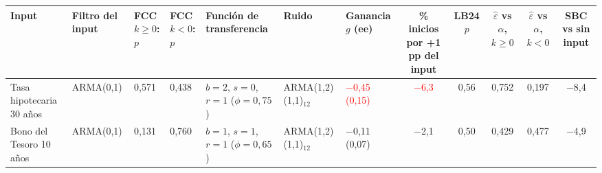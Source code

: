 \begin{tabular}{lllllllccccc}
\toprule
Input & Filtro del input & FCC $k\geq0$: $p$ & FCC $k<0$: $p$ & Funci\'on de transferencia & Ruido & Ganancia $g$ (ee) & \% inicios por +1 pp del input & LB24 $p$ & $\hat\varepsilon$ vs $\alpha$, $k\geq0$ & $\hat\varepsilon$ vs $\alpha$, $k<0$ & SBC vs sin input
\\ \midrule
Tasa hipotecaria 30 a\~nos & ARMA(0,1) & 0{,}571 & 0{,}438 & $b=2$, $s=0$, $r=1$ ($\phi=0{,}75$) & ARMA(1,2)(1,1)\ensuremath{_{12}} & \textcolor{red}{\ensuremath{-}0{,}45 (0{,}15)} & \textcolor{red}{\ensuremath{-}6{,}3} & 0{,}56 & 0{,}752 & 0{,}197 & \ensuremath{-}8{,}4 \\
Bono del Tesoro 10 a\~nos & ARMA(0,1) & 0{,}131 & 0{,}760 & $b=1$, $s=1$, $r=1$ ($\phi=0{,}65$) & ARMA(1,2)(1,1)\ensuremath{_{12}} & \ensuremath{-}0{,}11 (0{,}07) & \ensuremath{-}2{,}1 & 0{,}50 & 0{,}429 & 0{,}477 & \ensuremath{-}4{,}9 \\
\bottomrule
\end{tabular}
